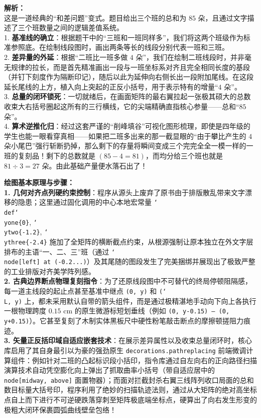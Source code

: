 \documentclass[12pt, a4paper]{ctexrep}
\begin{document}
{\small\color{gray}
\textbf{解析：}\\
这是一道经典的“和差问题”变式。题目给出三个班的总和为 $85$ 朵，且通过文字描述了三个班数量之间的逻辑差值系统。\\
1. \textbf{基准线的确立}：根据题干中的“三班和一班同样多”，我们将这两个班级作为标准参照底。在绘制线段图时，画出两条等长的线段分别代表一班和三班。\\
2. \textbf{差异量的外延}：根据“二班比一班多做 $4$ 朵”，我们在绘制二班线段时，并非毫无规律的拉长，而是首先精准画出一段与一班坐标系对齐且完全相同长度的基段（并钉下刻度作为隔断印记），随后以此为延伸向右侧长出一段附加尾线。在这段延长尾线的上方，植入向上突起的正反小括号，用于表示特有的增量“$4$ 朵”。\\
3. \textbf{总量的闭环锁死}：一切就绪后，在画面矩阵的最右翼拉起一张极其硕大的总数收束大右括号圈起这所有的三行横线，它的尖端精确直指核心参量——总和“$85$ 朵”。\\
4. \textbf{算术逆推化归}：经过这套严谨的“削峰填谷”可视化图形梳理，即使是四年级的学生也能一眼看穿真相——如果把二班多出来的那一截显眼的“由于攀比产生的 $4$ 朵小尾巴”强行斩断扔掉，那么剩下的存量将瞬间变成三个完完全全一模一样的一班的复刻品！剩下的总数就是 $(85-4=81)$，而均分给三个班也就是 $81 \div 3 = 27$ 朵。由此基础产量便水落石出了！
}

\vspace{0.6cm}

{\small\color{blue!70!black}
\textbf{绘图基本原理与步骤：}\\
\textbf{1. 几何对齐点列硬约束控制}：程序从源头上废弃了原书由于排版散乱带来文字漂移的隐患；这里通过固化调用的中心本地宏常量 \texttt{\char`\\def\char`\\yone\{0\}}, \texttt{\char`\\ytwo\{-1.2\}}, \texttt{\char`\\ythree\{-2.4\}} 施加了全矩阵的横断截点约束，从根源强制让原本独立在外文字层排布的主语“一、二、三”班（通过 \texttt{\char`\\node[left] at (-0.2...)}）及其尾随的图段发生了完美捆绑并展现出了极致严整的工业排版对齐美学阵列感。\\
\textbf{2. 古典边界断点物理复刻指令}：为了还原线段图中不可替代的终局停顿阻隔感，每一道主线段的起止点甚至基准中继点 \texttt{(0, y)} 和 \texttt{(\char`\\L, y)} 上，都未采用默认自带的箭头组件，而是通过极精湛地手动向下向上各执行一根物理跨度 $0.15\text{ cm}$ 的原生微游标短划垂线（例如 \texttt{(0, y-0.15) -- (0, y+0.15)}）。它甚至复刻了木制实体黑板尺中硬性粉笔敲击断点的摩擦顿搓阻力痕迹。\\
\textbf{3. 矢量正反括印域自适应嵌套技术}：在展示差异属性以及收束总量闭环时，核心库启用了其自身最引以为豪的强劲原生 \texttt{decorations.pathreplacing} 前端微调计算组件：例如针对二班的凸起标识段小括印，指令库通过自左向右的正向路径扫描演算技术自动凭空膨化向上弹出了抓取曲率小括号（带自适应居中的 \texttt{node[midway, above]} 面置物器）；而面对拦截封杀右翼三线阵列收口局面的总和数目标量大括号印，程序利用了绝妙的扫描轨迹法则，通过从大矩阵的绝对高坐标点自上而下进行不可逆硬跌落穿刺至矩阵极底端坐标点，硬算出了向右发生形变的极粗大闭环保裹圆弧曲线壁垒包络！
}
\end{document}
